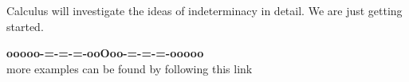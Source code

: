 \documentclass{ximera}
\begin{document}
Calculus will investigate the ideas of indeterminacy in detail.  We are just getting started.







\begin{onlineOnly}
\begin{center}
\textbf{\textcolor{green!50!black}{ooooo-=-=-=-ooOoo-=-=-=-ooooo}} \\

more examples can be found by following this link\\ 

\end{center}
\end{onlineOnly}
\end{document}
